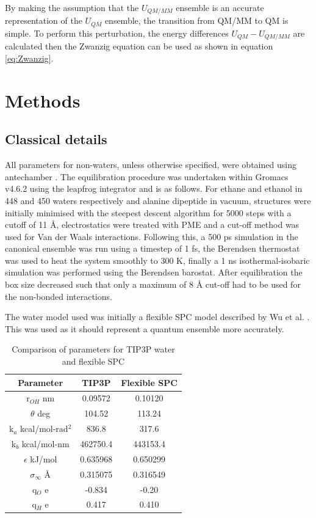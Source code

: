 By making the assumption that the $U_{QM/MM}$ ensemble is an accurate representation of the $U_{QM}$ ensemble, the transition from QM/MM to QM is simple.  To perform this perturbation, the energy differences $U_{QM}-U_{QM/MM}$ are calculated then the Zwanzig equation can be used as shown in equation \ref{eq:Zwanzig}.

\section{Methods}

\subsection{Classical details}

All parameters for non-waters, unless otherwise specified, were obtained using antechamber \cite{antechamber}.  The equilibration procedure was undertaken within Gromacs v4.6.2 \cite{ref_gromacs} using the leapfrog integrator and is as follows.  For ethane and ethanol in 448 and 450 waters respectively and alanine dipeptide in vacuum, structures were initially minimised with the steepest descent algorithm for 5000 steps with a cutoff of 11 \AA{}, electrostatics were treated with PME and a cut-off method was used for Van der Waals interactions.  Following this, a 500 ps simulation in the canonical ensemble was run using a timestep of 1 fs, the Berendsen thermostat was used to heat the system smoothly to 300 K, finally a 1 ns isothermal-isobaric simulation was performed using the Berendsen barostat.  After equilibration the box size decreased such that only a maximum of 8 \AA{} cut-off had to be used for the non-bonded interactions.

The water model used was initially a flexible SPC model described by Wu et al. \cite{flexible_spc}.  This was used as it should represent a quantum ensemble more accurately.

\begin{center}
\begin{table}[ht]
{
\hfill{}
\begin{tabular}{c | c | c }
\hline 
Parameter & TIP3P & Flexible SPC \\ 
\hline 
r$_{OH}$ nm & 0.09572 & 0.10120 \\
\hline 
$\theta$ deg & 104.52 & 113.24 \\
\hline 
k$_a$ kcal/mol-rad$^2$ & 836.8 & 317.6 \\
\hline 
k$_b$ kcal/mol-nm & 462750.4 & 443153.4 \\
\hline 
$\epsilon$ kJ/mol & 0.635968 & 0.650299 \\
\hline 
$\sigma_{\infty}$ \AA & 0.315075 & 0.316549 \\
\hline 
q$_{O}$ e & -0.834 & -0.20 \\
\hline 
q$_{H}$ e & 0.417 & 0.410 \\
\hline 
\end{tabular}}
\hfill{}
\caption{Comparison of parameters for TIP3P water and flexible SPC}
\label{table:TIP3P_vs_SPC}
\end{table}
\end{center}

